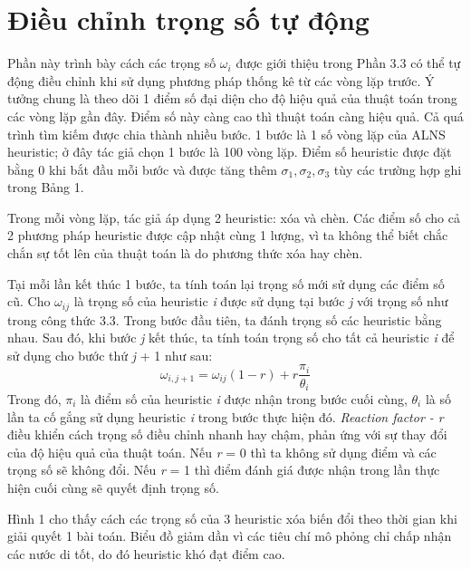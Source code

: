 \section{Điều chỉnh trọng số tự động}
Phần này trình bày cách các trọng số $\omega_i$ được giới thiệu trong Phần 3.3 có thể tự động điều chỉnh khi sử dụng phương pháp thống kê từ các vòng lặp trước. Ý tưởng chung là theo dõi 1 điểm số đại diện cho độ hiệu quả của thuật toán trong các vòng lặp gần đây. Điểm số này càng cao thì thuật toán càng hiệu quả. Cả quá trình tìm kiếm được chia thành nhiều bước. 1 bước là 1 số vòng lặp của ALNS heuristic; ở đây tác giả chọn 1 bước là 100 vòng lặp. Điểm số heuristic được đặt bằng 0 khi bắt đầu mỗi bước và được tăng thêm $\sigma_1, \sigma_2, \sigma_3$ tùy các trường hợp ghi trong Bảng 1.


Trong mỗi vòng lặp, tác giả áp dụng 2 heuristic: xóa và chèn. Các điểm số cho cả 2 phương pháp heuristic được cập nhật cùng 1 lượng, vì ta không thể biết chắc chắn sự tốt lên của thuật toán là do phương thức xóa hay chèn.

Tại mỗi lần kết thúc 1 bước, ta tính toán lại trọng số mới sử dụng các điểm số cũ. Cho $\omega_{ij}$ là trọng số của heuristic \textit{i} được sử dụng tại bước \textit{j} với trọng số như trong công thức 3.3. Trong bước đầu tiên, ta đánh trọng số các heuristic bằng nhau. Sau đó, khi bước \textit{j} kết thúc, ta tính toán trọng số cho tất cả heuristic \textit{i} để sử dụng cho bước thứ \textit{j} + 1 như sau:
\begin{equation}
    \omega_{i, j+1} = \omega_{ij}(1-r)+r\frac{\pi_i}{\theta_i}
\end{equation}
Trong đó, $\pi_i$ là điểm số của heuristic \textit{i} được nhận trong bước cuối cùng, $\theta_i$ là số lần ta cố gắng sử dụng heuristic \textit{i} trong bước thực hiện đó. \textit{Reaction factor - r} điều khiển cách trọng số điều chỉnh nhanh hay chậm, phản ứng với sự thay đổi của độ hiệu quả của thuật toán. Nếu \textit{r} = 0 thì ta không sử dụng điểm và các trọng số sẽ không đổi. Nếu \textit{r} = 1 thì điểm đánh giá được nhận trong lần thực hiện cuối cùng sẽ quyết định trọng số.


Hình 1 cho thấy cách các trọng số của 3 heuristic xóa biến đổi theo thời gian khi giải quyết 1 bài toán. Biểu đồ giảm dần vì các tiêu chí mô phỏng chỉ chấp nhận các nước di tốt, do đó heuristic khó đạt điểm cao.
